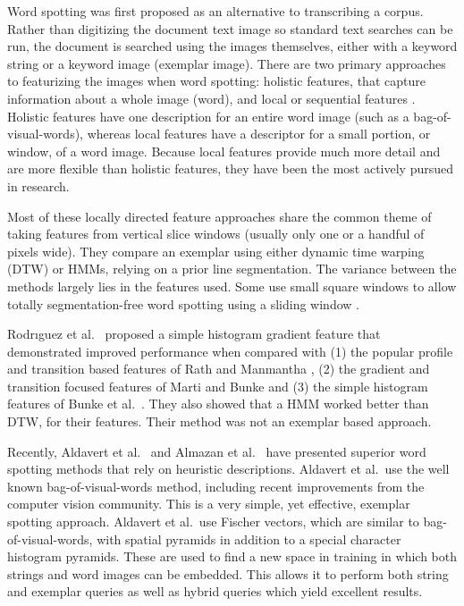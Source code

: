 \documentclass[ms]{byuprop}
\begin{document}
Word spotting was first proposed as an alternative to transcribing a corpus. Rather than digitizing the document text image so standard text searches can be run, the document is searched using the images themselves, either with a keyword string or a keyword image (exemplar image). There are two primary approaches to featurizing the images when word spotting: holistic features, that capture information about a whole image (word), and local or sequential features \cite{Rodrıguez2008}. Holistic features have one description for an entire word image (such as a bag-of-visual-words), whereas local features have a descriptor for a small portion, or window, of a word image. Because local features provide much more detail and are more flexible than holistic features, they have been the most actively pursued in research.

Most of these locally directed feature approaches share the common theme of taking features from vertical slice windows (usually only one or a handful of pixels wide). They compare an exemplar using either dynamic time warping (DTW) or HMMs, relying on a prior line segmentation. The variance between the methods largely lies in the features used. Some use small square windows to allow totally segmentation-free word spotting using a sliding window \cite{Rothacker2013}.

Rodr{\i}guez et al.~\cite{Rodrıguez2008} proposed a simple histogram gradient feature that demonstrated improved performance when compared with (1) the popular profile and transition based features of Rath and Manmantha \cite{Rath2003}, (2) the gradient and transition focused features of Marti and Bunke \cite{Marti2001} and (3) the simple histogram features of Bunke et al.~\cite{Bunke2004}. They also showed that a HMM worked better than DTW, for their features. Their method was not an exemplar based approach.

Recently, Aldavert et al.~\cite{Aldavert2015} and Almazan et al.~\cite{Almazan2014} have presented superior word spotting methods that rely on heuristic descriptions. Aldavert et al.~use the well known bag-of-visual-words method, including recent improvements from the computer vision community. This is a very simple, yet effective, exemplar spotting approach. Aldavert et al.~use Fischer vectors, which are similar to bag-of-visual-words, with spatial pyramids in addition to a special character histogram pyramids. These are used to find a new space in training in which both strings and word images can be embedded. This allows it to perform both string and exemplar queries as well as hybrid queries which yield excellent results.
\end{document}
